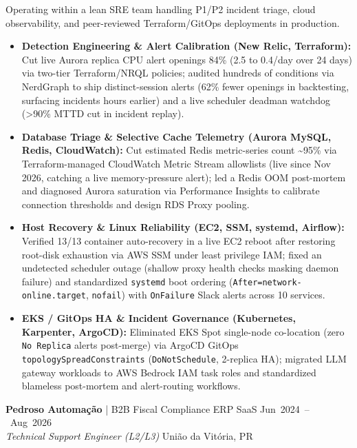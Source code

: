 \documentclass[10pt,a4paper]{article}
\begin{document}
Operating within a lean SRE team handling \mbox{P1/P2} incident triage, cloud observability, and \mbox{peer-reviewed} Terraform/GitOps deployments in production.
\begin{itemize}[topsep=1.5pt]
    \item \textbf{Detection Engineering \& Alert Calibration (New Relic, Terraform):} Cut live Aurora replica CPU alert openings 84\% (2.5 to 0.4/day over 24 days) via \mbox{two-tier} Terraform/NRQL policies; audited hundreds of conditions via NerdGraph to ship \mbox{distinct-session} alerts (62\% fewer openings in backtesting, surfacing incidents hours earlier) and a live scheduler deadman watchdog (>90\% MTTD cut in incident replay).
    \item \textbf{Database Triage \& Selective Cache Telemetry (Aurora MySQL, Redis, CloudWatch):} Cut estimated Redis \mbox{metric-series} count \textasciitilde{}95\% via \mbox{Terraform-managed} CloudWatch Metric Stream allowlists (live since Nov 2026, catching a live \mbox{memory-pressure} alert); led a Redis OOM \mbox{post-mortem} and diagnosed Aurora saturation via Performance Insights to calibrate connection thresholds and design RDS Proxy pooling.
    \item \textbf{Host Recovery \& Linux Reliability (EC2, SSM, systemd, Airflow):} Verified 13/13 container \mbox{auto-recovery} in a live EC2 reboot after restoring \mbox{root-disk} exhaustion via AWS SSM under least privilege IAM; fixed an undetected scheduler outage (shallow proxy health checks masking daemon failure) and standardized \texttt{systemd} boot ordering (\mbox{\texttt{After=network-online.target}}, \texttt{nofail}) with \texttt{OnFailure} Slack alerts across 10 services.
    \item \textbf{EKS / GitOps HA \& Incident Governance (Kubernetes, Karpenter, ArgoCD):} Eliminated EKS Spot \mbox{single-node} \mbox{co-location} (zero \texttt{No Replica} alerts \mbox{post-merge}) via ArgoCD GitOps \mbox{\texttt{topologySpreadConstraints}} (\mbox{\texttt{DoNotSchedule}}, \mbox{2-replica} HA); migrated LLM gateway workloads to AWS Bedrock IAM task roles and standardized blameless \mbox{post-mortem} and \mbox{alert-routing} workflows.
\end{itemize}

\newpage
\textbf{Pedroso Automação} | B2B Fiscal Compliance ERP SaaS \hfill \mbox{Jun 2024 -- Aug 2026} \\
\textit{Technical Support Engineer (\mbox{L2/L3})} \hfill União da Vitória, PR
\end{document}
